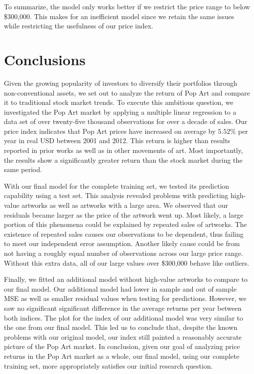 \documentclass[]{asaproc}\usepackage[]{graphicx}\usepackage[]{color}
\begin{document}
To summarize, the model only works better if we restrict the price range to below \$300,000. This makes for an inefficient model since we retain the same issues while restricting the usefulness of our price index. 

\section{Conclusions}

Given the growing popularity of investors to diversify their portfolios through non-conventional assets, we set out to analyze the return of Pop Art and compare it to traditional stock market trends. To execute this ambitious question, we investigated the Pop Art market by applying a multiple linear regression to a data set of over twenty-five thousand observations for over a decade of sales. Our price index indicates that Pop Art prices have increased on average by $5.52$\% per year in real USD between 2001 and 2012. This return is higher than results reported in prior works as well as in other movements of art. Most importantly, the results show a significantly greater return than the stock market during the same period.

With our final model for the complete training set, we tested its prediction capability using a test set. This analysis revealed problems with predicting high-value artworks as well as artworks with a large area. We observed that our residuals became larger as the price of the artwork went up. Most likely, a large portion of this phenomena could be explained by repeated sales of artworks. The existence of repeated sales causes our observations to be dependent, thus failing to meet our independent error assumption. Another likely cause could be from not having a roughly equal number of observations across our large price range. Without this extra data, all of our large values over \$300,000 behave like outliers. 

Finally, we fitted an additional model without high-value artworks to compare to our final model. Our additional model had lower in sample and out of sample MSE as well as smaller residual values when testing for predictions. However, we saw no significant significant difference in the average returns per year between both indices. The plot for the index of our additional model was very similar to the one from our final model. This led us to conclude that, despite the known problems with our original model, our index still painted a reasonably accurate picture of the Pop Art market. In conclusion, given our goal of analyzing price returns in the Pop Art market as a whole, our final model, using our complete training set, more appropriately satisfies our initial research question.
\end{document}
